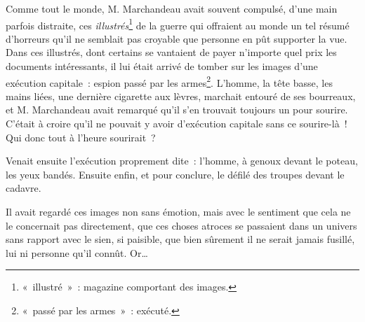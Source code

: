 
{

Comme tout le monde, M. Marchandeau avait souvent compulsé, d'une main
parfois distraite, ces
\textit{illustrés}\footnote{«~illustré~»~:
magazine comportant des images.}
 de la guerre qui offraient au monde un tel résumé d'horreurs qu'il ne
semblait pas croyable que personne en pût supporter la vue. Dans ces
illustrés, dont certains se vantaient de payer n'importe quel prix
les documents intéressants, il lui était arrivé de tomber sur les
images d'une exécution capitale~: espion passé par les
armes\footnote{«~passé par les armes~»~: exécuté.}. L'homme, la tête
basse, les mains liées, une dernière cigarette aux lèvres, marchait
entouré de ses bourreaux, et M. Marchandeau avait remarqué qu'il s'en
trouvait toujours un pour sourire. C'était à croire qu'il ne pouvait
y avoir d'exécution capitale sans ce sourire-là~! Qui donc tout à
l'heure sourirait~?

Venait ensuite l'exécution proprement dite~: l'homme, à genoux devant
le poteau, les yeux bandés. Ensuite enfin, et pour conclure, le
défilé des troupes devant le cadavre.

Il avait regardé ces images non sans émotion, mais avec le sentiment
que cela ne le concernait pas directement, que ces choses atroces se
passaient dans un univers sans rapport avec le sien, si paisible, que
bien sûrement il ne serait jamais fusillé, lui ni personne qu'il
connût. Or…

}
